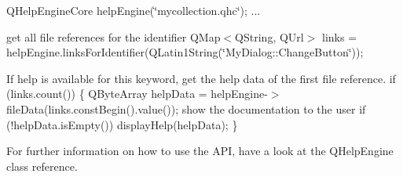 Q\-Help\-Engine\-Core help\-Engine(\char`\"{}mycollection.\-qhc\char`\"{}); ...

get all file references for the identifier Q\-Map$<$\-Q\-String, Q\-Url$>$ links = help\-Engine.\-links\-For\-Identifier(Q\-Latin1\-String(\char`\"{}\-My\-Dialog\-::\-Change\-Button\char`\"{}));

If help is available for this keyword, get the help data of the first file reference. if (links.\-count()) \{ Q\-Byte\-Array help\-Data = help\-Engine-\/$>$file\-Data(links.\-const\-Begin().value()); show the documentation to the user if (!help\-Data.is\-Empty()) display\-Help(help\-Data); \}

For further information on how to use the A\-P\-I, have a look at the Q\-Help\-Engine class reference. 